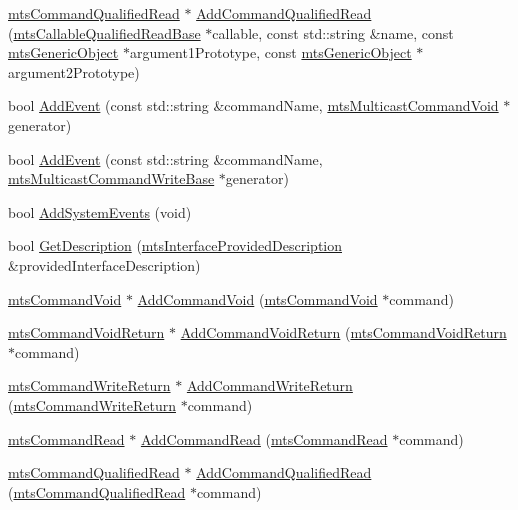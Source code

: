 \begin{DoxyCompactItemize}
\item 
\hyperlink{classmts_command_qualified_read}{mts\-Command\-Qualified\-Read} $\ast$ \hyperlink{classmts_interface_provided_a8c75f78b80489039839ac45ba152acf6}{Add\-Command\-Qualified\-Read} (\hyperlink{classmts_callable_qualified_read_base}{mts\-Callable\-Qualified\-Read\-Base} $\ast$callable, const std\-::string \&name, const \hyperlink{classmts_generic_object}{mts\-Generic\-Object} $\ast$argument1\-Prototype, const \hyperlink{classmts_generic_object}{mts\-Generic\-Object} $\ast$argument2\-Prototype)
\item 
bool \hyperlink{classmts_interface_provided_ac10644a4bff7c746528c4442dab69b64}{Add\-Event} (const std\-::string \&command\-Name, \hyperlink{classmts_multicast_command_void}{mts\-Multicast\-Command\-Void} $\ast$generator)
\item 
bool \hyperlink{classmts_interface_provided_abeaef52139a77f3100bf9f437a24acc1}{Add\-Event} (const std\-::string \&command\-Name, \hyperlink{classmts_multicast_command_write_base}{mts\-Multicast\-Command\-Write\-Base} $\ast$generator)
\item 
bool \hyperlink{classmts_interface_provided_aea73142d6bfe70f30be9ef051c3ac754}{Add\-System\-Events} (void)
\item 
bool \hyperlink{classmts_interface_provided_ab6c844e481cf4e5e6ba59e1c61341f4e}{Get\-Description} (\hyperlink{classmts_interface_provided_description}{mts\-Interface\-Provided\-Description} \&provided\-Interface\-Description)
\end{DoxyCompactItemize}
{\bf }\par
\begin{DoxyCompactItemize}
\item 
\hyperlink{classmts_command_void}{mts\-Command\-Void} $\ast$ \hyperlink{classmts_interface_provided_a411ee94b6d040a454f335621cc66ba50}{Add\-Command\-Void} (\hyperlink{classmts_command_void}{mts\-Command\-Void} $\ast$command)
\item 
\hyperlink{classmts_command_void_return}{mts\-Command\-Void\-Return} $\ast$ \hyperlink{classmts_interface_provided_a8f3e25f5f8c61db7375f0a88dca6d8fe}{Add\-Command\-Void\-Return} (\hyperlink{classmts_command_void_return}{mts\-Command\-Void\-Return} $\ast$command)
\item 
\hyperlink{classmts_command_write_return}{mts\-Command\-Write\-Return} $\ast$ \hyperlink{classmts_interface_provided_a1ce140f4fdc8cf6051f5a40c2dd631db}{Add\-Command\-Write\-Return} (\hyperlink{classmts_command_write_return}{mts\-Command\-Write\-Return} $\ast$command)
\item 
\hyperlink{classmts_command_read}{mts\-Command\-Read} $\ast$ \hyperlink{classmts_interface_provided_a58cd0b600035f04a7b9913d32e2dc20c}{Add\-Command\-Read} (\hyperlink{classmts_command_read}{mts\-Command\-Read} $\ast$command)
\item 
\hyperlink{classmts_command_qualified_read}{mts\-Command\-Qualified\-Read} $\ast$ \hyperlink{classmts_interface_provided_aaf37a3985a0b02afcbcff20a2e942161}{Add\-Command\-Qualified\-Read} (\hyperlink{classmts_command_qualified_read}{mts\-Command\-Qualified\-Read} $\ast$command)
\end{DoxyCompactItemize}

